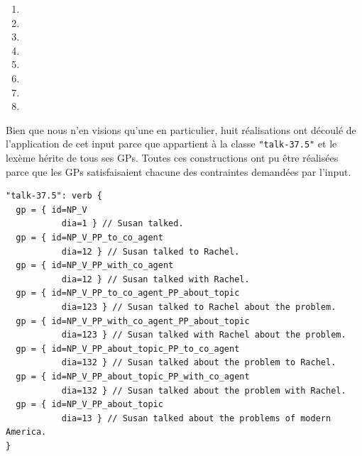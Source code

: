 \begin{enumerate}
  \item {}
  \item {}
  \item {}
  \item {}
  \item {}
  \item {}
  \item {}
  \item {}
\end{enumerate}

Bien que nous n'en visions qu'une en particulier, huit réalisations ont découlé de l'application de cet input parce que  appartient à la classe \texttt{"talk-37.5"} et le lexème hérite de tous ses \acp{GP}. Toutes ces constructions ont pu être réalisées parce que les \acp{GP} satisfaisaient chacune des contraintes demandées par l'input.

\begin{lstlisting}[language=mate, caption=Classe \texttt{talk-37.5} dans le \emph{lexicon}]
"talk-37.5": verb {
  gp = { id=NP_V
	       dia=1 } // Susan talked.
  gp = { id=NP_V_PP_to_co_agent
	       dia=12 } // Susan talked to Rachel.
  gp = { id=NP_V_PP_with_co_agent
	       dia=12 } // Susan talked with Rachel.
  gp = { id=NP_V_PP_to_co_agent_PP_about_topic
	       dia=123 } // Susan talked to Rachel about the problem.
  gp = { id=NP_V_PP_with_co_agent_PP_about_topic
	       dia=123 } // Susan talked with Rachel about the problem.
  gp = { id=NP_V_PP_about_topic_PP_to_co_agent
	       dia=132 } // Susan talked about the problem to Rachel.
  gp = { id=NP_V_PP_about_topic_PP_with_co_agent
	       dia=132 } // Susan talked about the problem with Rachel.
  gp = { id=NP_V_PP_about_topic
	       dia=13 } // Susan talked about the problems of modern America.
}
\end{lstlisting}


